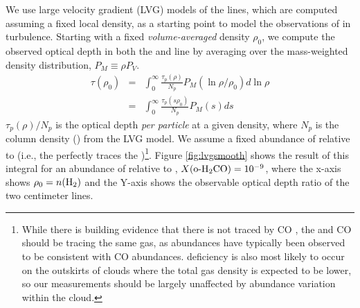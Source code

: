 We use large velocity gradient (LVG) models of the \formaldehyde lines, which are computed assuming a
fixed local density, as a starting point to model the observations of
\formaldehyde in turbulence.   Starting with a fixed \emph{volume-averaged}
density $\rho_0$, we compute the observed \formaldehyde optical depth in both
the \oneone and \twotwo
line by averaging over the mass-weighted density distribution, $P_M\equiv\rho P_V$.
\begin{eqnarray}
    \label{eqn:tauintegral}
    \tau(\rho_0) &=& \int_{0}^\infty \frac{\tau_p(\rho)}{N_p} P_M(\ln \rho/\rho_0) d \ln \rho\\
                 &=& \int_{0}^\infty \frac{\tau_p(s\rho_0)}{N_p} P_M(s) d s
\end{eqnarray} %
$\tau_p(\rho)/N_p$ is the optical depth \emph{per particle} at a given density, where $N_p$ is the column
density (\perkmspc) from the LVG model.
We assume a fixed abundance of \ortho relative to \hh
(i.e., the \formaldehyde perfectly traces the \hh)\footnote{While there is
building evidence that there is \hh not traced by CO
\citep{Shetty2011b,Shetty2011a}, the \formaldehyde and CO should be tracing the
same gas, as \formaldehyde abundances have typically been observed to be
consistent with CO abundances.  \formaldehyde deficiency is also most likely to
occur on the outskirts of clouds where the total gas density is expected to be
lower, so our measurements should be largely unaffected by abundance variation
within the cloud.}.
Figure \ref{fig:lvgsmooth}
shows the result of this integral for an abundance of \ortho relative to \hh, 
$X(\textrm{o-H}_2\textrm{CO})=10^{-9}$, where the x-axis shows $\rho_0 = n(\textrm{H}_{2})$ and the Y-axis
shows the observable optical depth ratio of the two \formaldehyde centimeter
lines.



